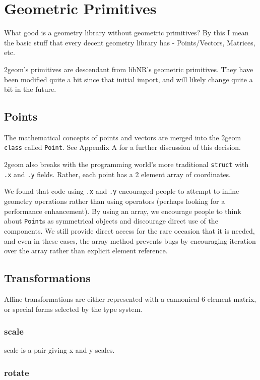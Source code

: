 \chapter{Geometric Primitives}

What good is a geometry library without geometric primitives?  By this
I mean the basic stuff that every decent geometry library has -
Points/Vectors, Matrices, etc.

2geom's primitives are descendant from libNR's geometric primitives.
They have been modified quite a bit since that initial import, and
will likely change quite a bit in the future.

\section{Points}

The mathematical concepts of points and vectors are merged into the
2geom \verb|class| called \verb|Point|.  See Appendix A for a further
discussion of this decision.

2geom also breaks with the programming world's more traditional
\verb|struct| with \verb|.x| and \verb|.y| fields.  Rather, each
point has a 2 element array of coordinates.

We found that code using \verb|.x| and \verb|.y| encouraged people
to attempt to inline geometry operations rather than using operators
(perhaps looking for a performance enhancement).  By using an array, we
encourage people to think about \verb|Point|s as symmetrical objects
and discourage direct use of the components.  We still provide direct
access for the rare occasion that it is needed, and even in these
cases, the array method prevents bugs by encouraging iteration over
the array rather than explicit element reference.

\section{Transformations}

Affine transformations are either represented with a cannonical 6
element matrix, or special forms selected by the type system.

\subsection{scale}

scale is a pair giving x and y scales.

\subsection{rotate}

